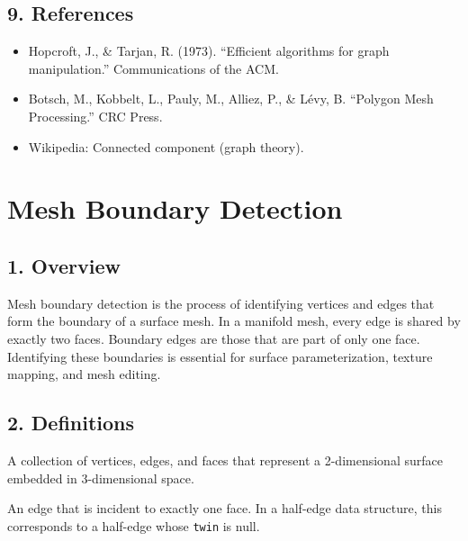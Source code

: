 \subsection{9. References}

\begin{itemize}
    \item Hopcroft, J., \& Tarjan, R. (1973). ``Efficient algorithms for graph manipulation.'' Communications of the ACM.
    \item Botsch, M., Kobbelt, L., Pauly, M., Alliez, P., \& L\'evy, B. \cite{botsch2010} ``Polygon Mesh Processing.'' CRC Press.
    \item Wikipedia: Connected component (graph theory).
\end{itemize}

\section{Mesh Boundary Detection}
\label{sec:mesh_boundary_detection}

\subsection{1. Overview}

Mesh boundary detection is the process of identifying vertices and edges that form the boundary of a surface mesh\cite{botsch2010}. In a manifold mesh, every edge is shared by exactly two faces. Boundary edges are those that are part of only one face. Identifying these boundaries is essential for surface parameterization, texture mapping, and mesh editing.

\subsection{2. Definitions}

\begin{definition}\label{def:surface_mesh}
A collection of vertices, edges, and faces that represent a 2-dimensional surface embedded in 3-dimensional space.
\end{definition}

\begin{definition}\label{def:boundary_edge}
An edge that is incident to exactly one face. In a half-edge data structure\cite{guibas1985}, this corresponds to a half-edge whose \texttt{twin} is null.
\end{definition}

